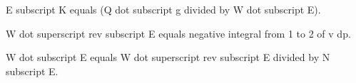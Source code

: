 E subscript K equals (Q dot subscript g divided by W dot subscript E).  

W dot superscript rev subscript E equals negative integral from 1 to 2 of v dp.  

W dot subscript E equals W dot superscript rev subscript E divided by N subscript E.